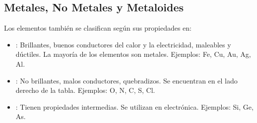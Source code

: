 \subsection{Metales, No Metales y Metaloides}
Los elementos también se clasifican según sus propiedades en:
\begin{itemize}
    \item {}: Brillantes, buenos conductores del calor y la electricidad, maleables y dúctiles. La mayoría de los elementos son metales. Ejemplos: Fe, Cu, Au, Ag, Al.
    \item {}: No brillantes, malos conductores, quebradizos. Se encuentran en el lado derecho de la tabla. Ejemplos: O, N, C, S, Cl.
    \item {}: Tienen propiedades intermedias. Se utilizan en electrónica. Ejemplos: Si, Ge, As.
\end{itemize}
